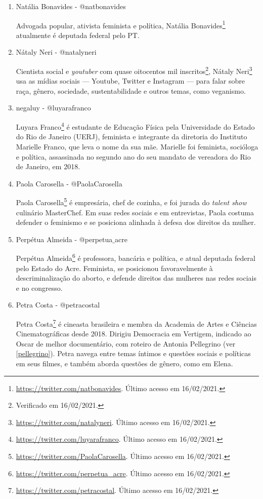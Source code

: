 \documentclass[
	12pt,				%
	openright,			%
	twoside,			%
	a4paper,			%
	english,			%
	brazil				%
	]{abntex2}
\begin{document}
\begin{anexosenv}
\begin{enumerate}
 \item Natália Bonavides - @natbonavides
 
 Advogada popular, ativista feminista e política, Natália Bonavides\footnote{\url{https://twitter.com/natbonavides}. Último acesso em 16/02/2021.} atualmente é deputada federal pelo PT.

 \item Nátaly Neri - @natalyneri
 
 Cientista social e \textit{youtuber} com quase oitocentos mil inscritos\footnote{Verificado em 16/02/2021.}, Nátaly Neri\footnote{\url{https://twitter.com/natalyneri}. Último acesso em 16/02/2021.} usa as mídias sociais --- Youtube, Twitter e Instagram --- para falar sobre raça, gênero, sociedade, sustentabilidade e outros temas, como veganismo.

 \item negaluy - @luyarafranco\label{luyfranco}
 
 Luyara Franco\footnote{\url{https://twitter.com/luyarafranco}. Último acesso em 16/02/2021.} é estudante de Educação Física pela Universidade do Estado do Rio de Janeiro (UERJ), feminista e integrante da diretoria do Instituto Marielle Franco, que leva o nome da sua mãe. Marielle foi feminista, socióloga e política, assassinada no segundo ano do seu mandato de vereadora do Rio de Janeiro, em 2018.

 \item Paola Carosella - @PaolaCarosella
 
 Paola Carosella\footnote{\url{https://twitter.com/PaolaCarosella}. Último acesso em 16/02/2021.} é empresária, chef de cozinha, e foi jurada do \textit{talent show} culinário MasterChef. Em suas redes sociais e em entrevistas, Paola costuma defender o feminismo e se posiciona alinhada à defesa dos direitos da mulher.

 \item Perpétua Almeida - @perpetua$\_$acre
 
 Perpétua Almeida\footnote{\url{https://twitter.com/perpetua_acre}. Último acesso em 16/02/2021.} é professora, bancária e política, e atual deputada federal pelo Estado do Acre. Feminista, se posicionou favoravelmente à descriminalização do aborto, e defende direitos das mulheres nas redes sociais e no congresso.

 \item Petra Costa - @petracostal\label{PetraCosta}
 
 Petra Costa\footnote{\url{https://twitter.com/petracostal}. Último acesso em 16/02/2021.} é cineasta brasileira e membra da Academia de Artes e Ciências Cinematográficas desde 2018. Dirigiu Democracia em Vertigem, indicado ao Oscar de melhor documentário, com roteiro de Antonia Pellegrino (ver \ref{pellegrino}). Petra navega entre temas íntimos e questões sociais e políticas em seus filmes, e também aborda questões de gênero, como em Elena.


\end{enumerate}
\end{anexosenv}
\end{document}
